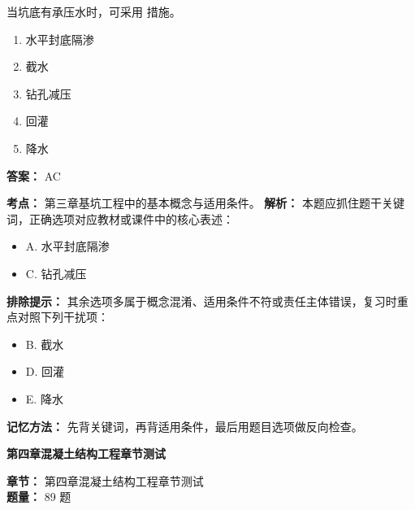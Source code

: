 \documentclass[UTF8,fontset=fandol,11pt]{ctexart}
\newcommand{\chaptertitle}[1]{\vspace{0.5em}\begin{tcolorbox}[enhanced,colback=deepblue,colframe=deepblue,arc=2mm,boxrule=0pt]\begin{center}\Large\bfseries\color{white}#1\end{center}\end{tcolorbox}\vspace{0.5em}}
\begin{document}
\begin{quizbox}[title={第 23 题}]
当坑底有承压水时，可采用 措施。\\
\begin{enumerate}[label=\Alph*.]
\item 水平封底隔渗
\item 截水
\item 钻孔减压
\item 回灌
\item 降水
\end{enumerate}
\textbf{答案：} AC
\vspace{0.25em}
\begin{answerbox}[title={考点解析}]
\textbf{考点：} 第三章基坑工程中的基本概念与适用条件。
\textbf{解析：} 本题应抓住题干关键词，正确选项对应教材或课件中的核心表述：
\begin{itemize}
\item A. 水平封底隔渗
\item C. 钻孔减压
\end{itemize}
\textbf{排除提示：} 其余选项多属于概念混淆、适用条件不符或责任主体错误，复习时重点对照下列干扰项：
\begin{itemize}
\item B. 截水
\item D. 回灌
\item E. 降水
\end{itemize}
\textbf{记忆方法：} 先背关键词，再背适用条件，最后用题目选项做反向检查。
\end{answerbox}
\end{quizbox}

\chaptertitle{第四章混凝土结构工程章节测试}
\begin{mainbox}
\textbf{\textcolor{mainblue}{章节：}} 第四章混凝土结构工程章节测试\\
\textbf{\textcolor{answerred}{题量：}} 89 题
\end{mainbox}
\end{document}
